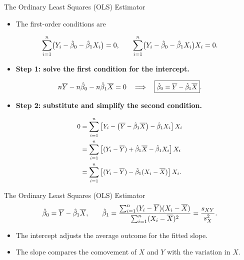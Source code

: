 \documentclass[notes,10pt, aspectratio=169]{beamer}
\begin{document}
\begin{frame}{The Ordinary Least Squares (OLS) Estimator}
\begin{itemize}
    \item The first-order conditions are
\end{itemize}
\begin{equation*}
\small
\sum_{i=1}^n\bigl(Y_i-\hat{\beta}_0-\hat{\beta}_1X_i\bigr)=0,
\qquad
\sum_{i=1}^n\bigl(Y_i-\hat{\beta}_0-\hat{\beta}_1X_i\bigr)X_i=0.
\end{equation*}
\begin{itemize}
    \item \textbf{Step 1: solve the first condition for the intercept.}
\end{itemize}
\begin{equation*}
\small
n\overline{Y}-n\hat{\beta}_0-n\hat{\beta}_1\overline{X}=0
\quad\Longrightarrow\quad
\boxed{\hat{\beta}_0=\overline{Y}-\hat{\beta}_1\overline{X}}.
\end{equation*}
\begin{itemize}
    \item \textbf{Step 2: substitute and simplify the second condition.}
\end{itemize}
\begin{equation*}
\small
\begin{aligned}
0
&=\sum_{i=1}^n
\left[Y_i-\left(\overline{Y}-\hat{\beta}_1\overline{X}\right)-\hat{\beta}_1X_i\right]X_i\\
&=\sum_{i=1}^n
\left[(Y_i-\overline{Y})+\hat{\beta}_1\overline{X}-\hat{\beta}_1X_i\right]X_i\\
&=\sum_{i=1}^n
\left[(Y_i-\overline{Y})-\hat{\beta}_1(X_i-\overline{X})\right]X_i.
\end{aligned}
\end{equation*}
\end{frame}

\begin{frame}{The Ordinary Least Squares (OLS) Estimator}
\begin{equation*}
\small
\hat{\beta}_0=\overline{Y}-\hat{\beta}_1\overline{X},
\qquad
\hat{\beta}_1
=\frac{\sum_{i=1}^n(Y_i-\overline{Y})(X_i-\overline{X})}
{\sum_{i=1}^n(X_i-\overline{X})^2}
=\frac{s_{XY}}{s_X^2}.
\end{equation*}
\begin{itemize}
    \item The intercept adjusts the average outcome for the fitted slope.
    \item The slope compares the comovement of $X$ and $Y$ with the variation in $X$.
\end{itemize}

\end{frame}
\end{document}
